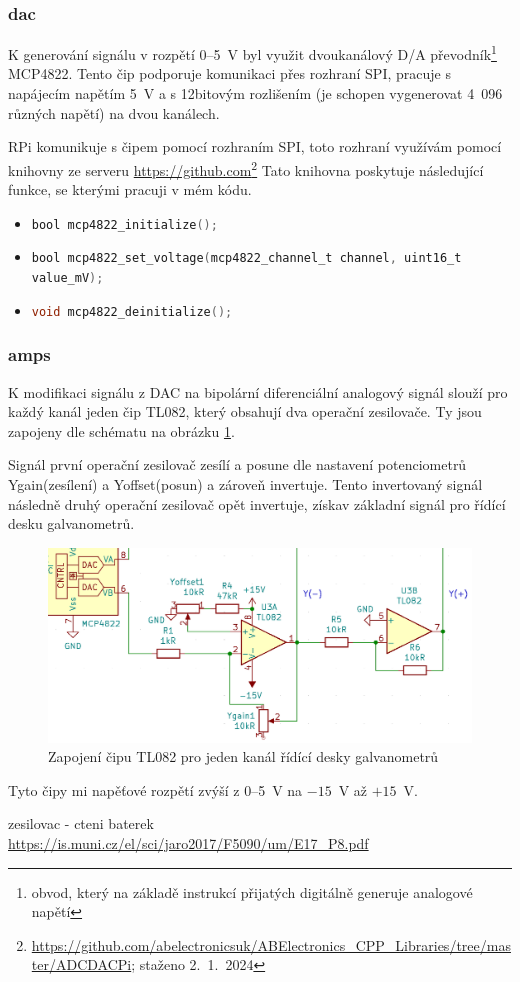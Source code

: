 \subsubsection{dac\cite{mcp4822-dsh}}
K generování signálu v rozpětí 0--5~V byl využit dvoukanálový D/A převodník\footnote{obvod, který na základě instrukcí přijatých digitálně generuje analogové napětí} MCP4822.
Tento čip podporuje komunikaci přes rozhraní SPI, pracuje s napájecím napětím 5~V a s 12bitovým rozlišením (je schopen vygenerovat 4~096 různých napětí) na dvou kanálech.

RPi komunikuje s čipem pomocí rozhraním SPI, toto rozhraní využívám pomocí knihovny ze serveru \url{https://github.com}\footnote{\url{https://github.com/abelectronicsuk/ABElectronics_CPP_Libraries/tree/master/ADCDACPi}; staženo 2.~1.~2024} 
Tato knihovna poskytuje následující funkce, se kterými pracuji v mém kódu.
\begin{itemize}
\item
\lstinline[language=C]!bool mcp4822_initialize();!
\item
\lstinline[language=C]!bool mcp4822_set_voltage(mcp4822_channel_t channel, uint16_t value_mV);!
\item
\lstinline[language=C]!void mcp4822_deinitialize();!
\end{itemize}
\subsubsection{amps\cite{tl082-dsh}}
K modifikaci signálu z DAC na bipolární diferenciální analogový signál slouží pro každý kanál jeden čip TL082, který obsahují dva operační zesilovače. Ty jsou zapojeny dle schématu na obrázku \ref{fig:ilda_amps-scheme}.

Signál první operační zesilovač zesílí a posune dle nastavení potenciometrů Ygain(zesílení) a Yoffset(posun) a zároveň invertuje. Tento invertovaný signál následně druhý operační zesilovač opět invertuje, získav základní signál pro řídící desku galvanometrů.

\begin{figure}[!htb]
  \centering
  \includegraphics[width=1\textwidth]{img/ilda_amps.png} 
  \caption{\label{fig:ilda_amps-scheme} Zapojení čipu TL082 pro jeden kanál řídící desky galvanometrů}
\end{figure}

Tyto čipy mi napěťové rozpětí zvýší z 0--5~V na $-15$~V až $+15$~V.

zesilovac - cteni baterek \url{https://is.muni.cz/el/sci/jaro2017/F5090/um/E17_P8.pdf}
